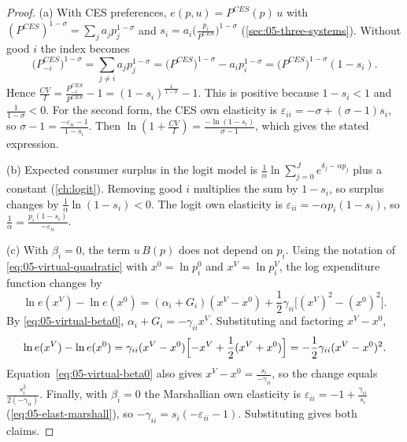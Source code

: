 \begin{proof}
(a) With CES preferences, $e(p,u) = P^{CES}(p)\,u$ with
$(P^{CES})^{1-\sigma} = \sum_j a_jp_j^{1-\sigma}$ and $s_i = a_i\bigl(\frac{p_i}{P^{CES}}\bigr)^{1-\sigma}$
(\cref{sec:05-three-systems}). Without good $i$ the index becomes
\begin{equation*}
  \bigl(P^{CES}_{-i}\bigr)^{1-\sigma} = \sum_{j\neq i}a_jp_j^{1-\sigma}
  = \bigl(P^{CES}\bigr)^{1-\sigma} - a_ip_i^{1-\sigma} = \bigl(P^{CES}\bigr)^{1-\sigma}(1 - s_i).
\end{equation*}
Hence $\frac{CV}{I} = \frac{P^{CES}_{-i}}{P^{CES}} - 1 = (1 - s_i)^{\frac{1}{1-\sigma}} - 1$. This is
positive because $1 - s_i < 1$ and $\frac{1}{1-\sigma} < 0$. For the second form, the CES own elasticity is
$\varepsilon_{ii} = -\sigma + (\sigma - 1)s_i$, so $\sigma - 1 = \frac{-\varepsilon_{ii} - 1}{1 - s_i}$. Then
$\ln(1 + \frac{CV}{I}) = \frac{-\ln(1 - s_i)}{\sigma - 1}$, which gives the stated expression.

(b) Expected consumer surplus in the logit model is $\frac{1}{\alpha}\ln\sum_{j=0}^{J}e^{\delta_j - \alpha p_j}$
plus a constant (\cref{ch:logit}). Removing good $i$ multiplies the sum by $1 - s_i$, so surplus changes by
$\frac{1}{\alpha}\ln(1 - s_i) < 0$. The logit own elasticity is $\varepsilon_{ii} = -\alpha p_i(1 - s_i)$, so
$\frac{1}{\alpha} = \frac{p_i(1 - s_i)}{-\varepsilon_{ii}}$.

(c) With $\beta_i = 0$, the term $u\,B(p)$ does not depend on $p_i$. Using the notation of
\eqref{eq:05-virtual-quadratic} with $x^0 = \ln p_i^0$ and $x^V = \ln p_i^V$, the log expenditure function
changes by
\begin{equation*}
  \ln e(x^V) - \ln e(x^0) = (\alpha_i + G_i)(x^V - x^0) + \frac{1}{2}\gamma_{ii}\bigl[(x^V)^2 - (x^0)^2\bigr].
\end{equation*}
By \eqref{eq:05-virtual-beta0}, $\alpha_i + G_i = -\gamma_{ii}x^V$. Substituting and factoring $x^V - x^0$,
\begin{equation*}
  \ln e(x^V) - \ln e(x^0) = \gamma_{ii}(x^V - x^0)\Bigl[-x^V + \frac{1}{2}(x^V + x^0)\Bigr]
  = -\frac{1}{2}\gamma_{ii}(x^V - x^0)^2.
\end{equation*}
Equation~\eqref{eq:05-virtual-beta0} also gives $x^V - x^0 = \frac{s_i}{-\gamma_{ii}}$, so the change equals
$\frac{s_i^2}{2(-\gamma_{ii})}$. Finally, with $\beta_i = 0$ the Marshallian own elasticity is
$\varepsilon_{ii} = -1 + \frac{\gamma_{ii}}{s_i}$ (\eqref{eq:05-elast-marshall}), so
$-\gamma_{ii} = s_i(-\varepsilon_{ii} - 1)$. Substituting gives both claims.
\end{proof}

